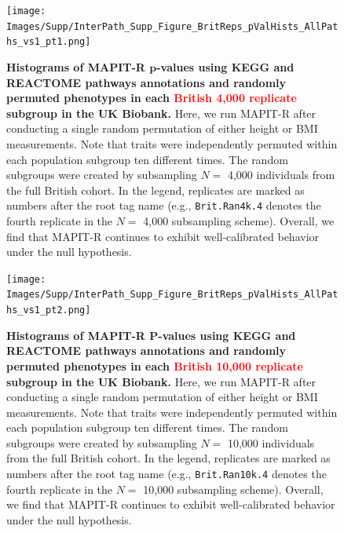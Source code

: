 \documentclass[10pt]{article}
\begin{document}
\begin{figure}[htbp]
\centering
\texttt{[image: Images/Supp/InterPath\_Supp\_Figure\_BritReps\_pValHists\_AllPaths\_vs1\_pt1.png]}
\caption{\textbf{Histograms of MAPIT-R $\bm{p}$-values using KEGG and REACTOME pathways annotations and randomly permuted phenotypes in each \textcolor{red}{British 4,000 replicate} subgroup in the UK Biobank.} Here, we run MAPIT-R after conducting a single random permutation of either height or BMI measurements. Note that traits were independently permuted within each population subgroup ten different times. The random subgroups were created by subsampling $N =$ 4,000 individuals from the full British cohort. In the legend, replicates are marked as numbers after the root tag name (e.g., \texttt{Brit.Ran4k.4} denotes the fourth replicate in the $N =$ 4,000 subsampling scheme). Overall, we find that MAPIT-R continues to exhibit well-calibrated behavior under the null hypothesis.}
\label{InterPath-Supp-Figure-BritReps-10perms-pValHists-pt1}
\end{figure}
\clearpage

\begin{figure}[htbp]
\centering
\texttt{[image: Images/Supp/InterPath\_Supp\_Figure\_BritReps\_pValHists\_AllPaths\_vs1\_pt2.png]}
\caption{\textbf{Histograms of MAPIT-R $\bm{P}$-values using KEGG and REACTOME pathways annotations and randomly permuted phenotypes in each \textcolor{red}{British 10,000 replicate} subgroup in the UK Biobank.} Here, we run MAPIT-R after conducting a single random permutation of either height or BMI measurements. Note that traits were independently permuted within each population subgroup ten different times. The random subgroups were created by subsampling $N =$ 10,000 individuals from the full British cohort. In the legend, replicates are marked as numbers after the root tag name (e.g., \texttt{Brit.Ran10k.4} denotes the fourth replicate in the $N =$ 10,000 subsampling scheme). Overall, we find that MAPIT-R continues to exhibit well-calibrated behavior under the null hypothesis.}
\label{InterPath-Supp-Figure-BritReps-10perms-pValHists-pt2}
\end{figure}
\clearpage
\end{document}

